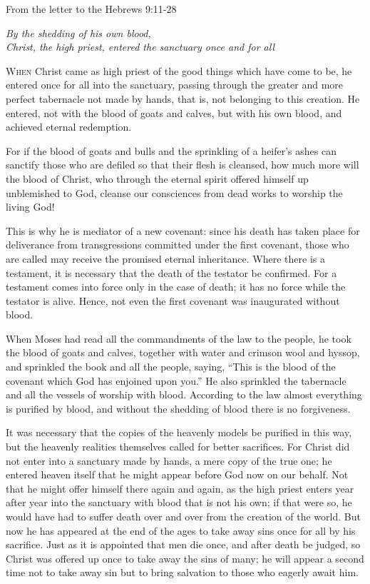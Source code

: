 \vspace{5pt}
\noindent From the letter to the Hebrews \hfill 9:11-28

\begin{center}\textit{By the shedding of his own blood, \\Christ, the high priest, entered the sanctuary once and for all}\end{center}

\lettrine[lines=3,loversize=0.15]{W}{hen} Christ came as high priest of the good things which have come to be, he entered once for all into the sanctuary, passing through the greater and more perfect tabernacle not made by hands, that is, not belonging to this creation. He entered, not with the blood of goats and calves, but with his own blood, and achieved eternal redemption.

For if the blood of goats and bulls and the sprinkling of a heifer’s ashes can sanctify those who are defiled so that their flesh is cleansed, how much more will the blood of Christ, who through the eternal spirit offered himself up unblemished to God, cleanse our consciences from dead works to worship the living God!

This is why he is mediator of a new covenant: since his death has taken place for deliverance from transgressions committed under the first covenant, those who are called may receive the promised eternal inheritance. Where there is a testament, it is necessary that the death of the testator be confirmed. For a testament comes into force only in the case of death; it has no force while the testator is alive. Hence, not even the first covenant was inaugurated without blood.

When Moses had read all the commandments of the law to the people, he took the blood of goats and calves, together with water and crimson wool and hyssop, and sprinkled the book and all the people, saying, “This is the blood of the covenant which God has enjoined upon you.” He also sprinkled the tabernacle and all the vessels of worship with blood. According to the law almost everything is purified by blood, and without the shedding of blood there is no forgiveness.

It was necessary that the copies of the heavenly models be purified in this way, but the heavenly realities themselves called for better sacrifices. For Christ did not enter into a sanctuary made by hands, a mere copy of the true one; he entered heaven itself that he might appear before God now on our behalf. Not that he might offer himself there again and again, as the high priest enters year after year into the sanctuary with blood that is not his own; if that were so, he would have had to suffer death over and over from the creation of the world. But now he has appeared at the end of the ages to take away sins once for all by his sacrifice. Just as it is appointed that men die once, and after death be judged, so Christ was offered up once to take away the sins of many; he will appear a second time not to take away sin but to bring salvation to those who eagerly await him.

